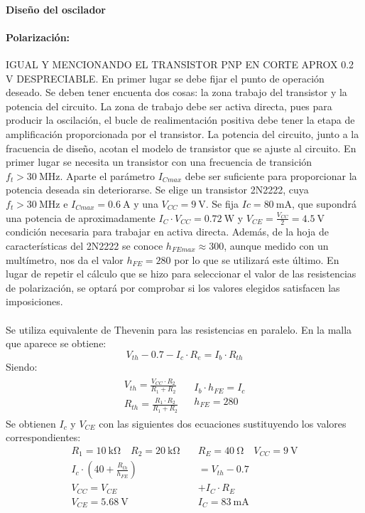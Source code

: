 \paragraph{Diseño del oscilador}
\paragraph{Polarizaci\'on:} IGUAL Y MENCIONANDO EL TRANSISTOR PNP EN CORTE APROX 0.2 V DESPRECIABLE.
En primer lugar se debe fijar el punto de operación deseado. Se deben tener encuenta dos cosas: la zona trabajo del transistor y la potencia del circuito. La zona de trabajo debe ser activa directa, pues para producir la oscilación, el bucle de realimentación positiva debe tener la etapa de amplificación proporcionada por el transistor. La potencia del circuito, junto a la fracuencia de diseño, acotan el modelo de transistor que se ajuste al circuito.
En primer lugar se necesita un transistor con una frecuencia de transición $f_t > \SI{30}{\mega\hertz}$. Aparte el parámetro $I_{Cmax}$ debe ser suficiente para proporcionar la potencia deseada sin deteriorarse. Se elige un transistor 2N2222, cuya $f_t > \SI{30}{\mega\hertz}$ e $I_{Cmax} = \SI{0.6}{\ampere}$ y una $V_{CC} = \SI{9}{\volt}$. Se fija $Ic = \SI{80}{\milli\ampere}$, que supondr\'a una potencia de aproximadamente $I_C \cdot V_{CC} = \SI{0.72}{\watt}$ y $V_{CE} = \frac{V_{CC}}{2} = \SI{4.5}{\volt}$ condici\'on necesaria para trabajar en activa directa. Además, de la hoja de características del 2N2222 se conoce $h_{FEmax} \approx 300$, aunque medido con un mult\'imetro, nos da el valor $h_{FE} = 280$ por lo que se utilizar\'a este \'ultimo.
En lugar de repetir el cálculo que se hizo para seleccionar el valor de las resistencias de polarización, se optará por comprobar si los valores elegidos satisfacen las imposiciones.
\paragraph{}
Se utiliza equivalente de Thevenin para las resistencias en paralelo. En la malla que aparece se obtiene:
$$V_{th} - 0.7 - I_c \cdot R_e = I_b \cdot R_{th}$$
Siendo:
\[
\begin{array}{rl} 
      \begin{array}{l}
	 V_{th} = \frac{V_{CC} \cdot R_2}{R_1+R_2} \\
	 R_{th} = \frac{R_1 \cdot R_2}{R_1+R_2}
      \end{array}
      &
      \begin{array}{l}
	 I_b \cdot h_{FE}= I_c \\
	 h_{FE} = 280
      \end{array}
\end{array}
\]
Se obtienen $I_c$ y $V_{CE}$ con las siguientes dos ecuaciones sustituyendo los valores correspondientes:
\begin{align*}
   R_1=\SI{10}{\kilo\ohm} \quad R_2=\SI{20}{\kilo\ohm} \quad &R_E=\SI{40}{\ohm} \quad V_{CC} = \SI{9}{\volt} \\
   I_c \cdot \left( 40+ \frac{R_{th}}{h_{FE}}\right) &= V_{th} - 0.7 \\
   V_{CC} = V_{CE} &+ I_C \cdot R_E \\
   V_{CE}= \SI{5.68}{\volt} \quad& I_C = \SI{83}{\milli\ampere}
\end{align*}
